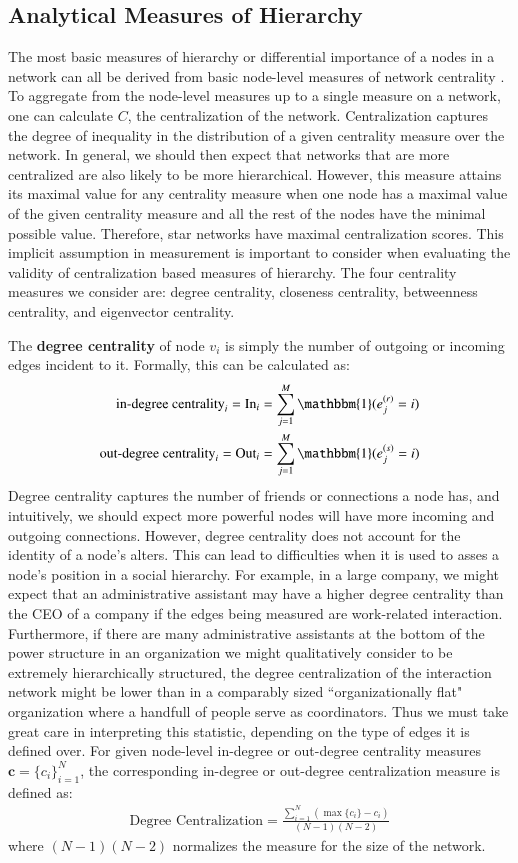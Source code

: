 \documentclass[3p,times]{elsarticle}
\begin{document}
\subsection{Analytical Measures of Hierarchy}
\label{sec:analytical measures}
The most basic measures of hierarchy or differential importance of a nodes in a network can all be derived from basic node-level measures of network centrality \cite{Wasserman1994}. To aggregate from the node-level measures up to a single measure on a network, one can calculate $C$, the centralization of the network. Centralization captures the degree of inequality in the distribution of a given centrality measure over the network. In general, we should then expect that networks that are more centralized are also likely to be more hierarchical. However, this measure attains its maximal value for any centrality measure when one node has a maximal value of the given centrality measure and all the rest of the nodes have the minimal possible value. Therefore, star networks have maximal centralization scores. This implicit assumption in measurement is important to consider when evaluating the validity of centralization based measures of hierarchy. The four centrality measures we consider are: degree centrality, closeness centrality, betweenness centrality, and eigenvector centrality. 

The \textbf{degree centrality} of node $v_{i}$ is simply the number of outgoing or incoming edges incident to it. Formally, this can be calculated as:
\begin{align}
	\text{in-degree centrality}_i = \text{In}_i&= \sum_{j=1}^M \mathbbm{1}(e_j^{(r)} = i) \\
	\text{out-degree centrality}_i  = \text{Out}_i &= \sum_{j=1}^M \mathbbm{1}(e_j^{(s)} = i) 
\end{align}
Degree centrality captures the number of friends or connections a node has, and intuitively, we should expect more powerful nodes will have more incoming and outgoing connections. However, degree centrality does not account for the identity of a node's alters. This can lead to difficulties when it is used to asses a node's position in a social hierarchy. For example, in a large company, we might expect that an administrative assistant may have a higher degree centrality than the CEO of a company if the edges being measured are work-related interaction. Furthermore, if there are many administrative assistants at the bottom of the power structure in an organization we might qualitatively consider to be extremely hierarchically structured, the degree centralization of the interaction network might be lower than in a comparably sized ``organizationally flat" organization where a handfull of people serve as coordinators. Thus we must take great care in interpreting this statistic, depending on the type of edges it is defined over. For given node-level in-degree or out-degree centrality measures $\mathbf{c} = \{c_i\}_{i=1}^N$, the corresponding in-degree or out-degree centralization measure is defined as: 
\begin{align}
	\text{Degree Centralization} = \frac{\sum_{i=1}^{N}{(\max\{c_{i}\}-c_{i})}}{(N-1)(N-2)}
\end{align}
where $(N-1)(N-2)$ normalizes the measure for the size of the network.
\end{document}
